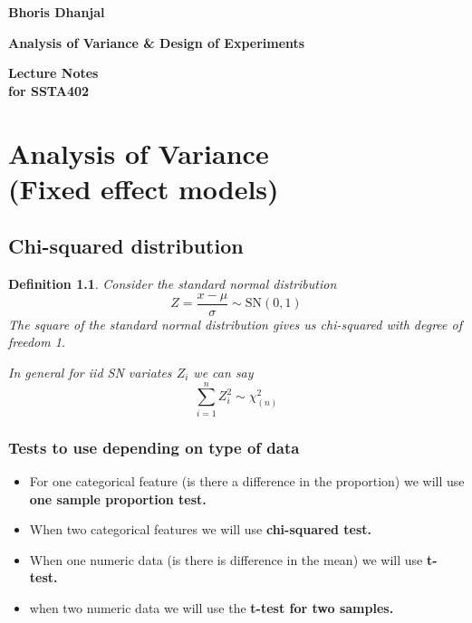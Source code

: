 \documentclass[oneside,11pt,pdftex]{book}%
\numberwithin{equation}{section}
\newtheorem{definition}[theorem]{Definition}
\numberwithin{section}{chapter}
\numberwithin{equation}{chapter}
\begin{document}
\frontmatter

\thispagestyle{empty}
\begin{flushright}
{\LARGE \textbf{Bhoris Dhanjal}}%
\end{flushright}
\vfill
\begin{center}
{\fontsize{29.86truept}{0truept}\selectfont \textbf{Analysis of Variance \& Design of Experiments}}%
\end{center}
\vfill
\begin{flushleft}
{\LARGE \textbf{Lecture Notes}} \\
\hspace{-1.75truept}
{\large \textbf{for SSTA402}}
\end{flushleft}
\newpage

\tableofcontents


\mainmatter

\chapter{Analysis of Variance\\ (Fixed effect models)}
\section{Chi-squared distribution}
\begin{definition}\label{def:chisquaredist}
	Consider the standard normal distribution \[ Z=\frac{x-\mu}{\sigma} \sim \text{SN}(0,1)\]
The square of the standard normal distribution gives us chi-squared with degree of freedom 1.

\par In general for iid SN variates $ Z_i $ we can say
\[ \sum_{i=1}^n Z_i^2 \sim \chi^2_{(n)} \]
\end{definition}

\subsection{Tests to use depending on type of data}
\begin{itemize}
	\item For one categorical feature (is there a difference in the proportion) we will use \textbf{one sample proportion test.} 
	\item When two categorical features we will use \textbf{chi-squared test.}
	\item When one numeric data (is there is difference in the mean) we will use \textbf{t-test.}
	\item when two numeric data we will use the \textbf{t-test for two samples.}
\end{itemize}
\end{document}
